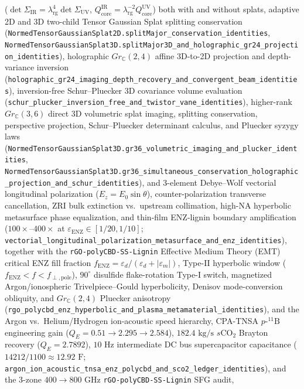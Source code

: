 ($\det\Sigma_{\mathrm{IR}}=\lambda_{\mathrm{rg}}^4\det\Sigma_{\mathrm{UV}}$,
$Q_{\mathrm{core}}^{\mathrm{IR}}=\lambda_{\mathrm{rg}}^{-2}Q_{\mathrm{core}}^{\mathrm{UV}}$)
both with and without splats, adaptive 2D and 3D two-child Tensor Gaussian Splat
splitting conservation (\texttt{NormedTensorGaussianSplat2D.splitMajor\_conservation\_identities},
\texttt{NormedTensorGaussianSplat3D.splitMajor3D\_and\_holographic\_gr24\_projection\_identities}),
holographic $Gr_{\mathbb C}(2,4)$ affine 3D-to-2D projection and depth-variance
inversion (\texttt{holographic\_gr24\_imaging\_depth\_recovery\_and\_convergent\_beam\_identities}),
inversion-free Schur--Pluecker 3D covariance volume evaluation
(\texttt{schur\_plucker\_inversion\_free\_and\_twistor\_vane\_identities}),
higher-rank $Gr_{\mathbb C}(3,6)$ direct 3D volumetric splat imaging, splitting
conservation, perspective projection, Schur--Pluecker determinant calculus, and
Pluecker syzygy laws (\texttt{NormedTensorGaussianSplat3D.gr36\_volumetric\_imaging\_and\_plucker\_identities},
\texttt{NormedTensorGaussianSplat3D.gr36\_simultaneous\_conservation\_holographic\_projection\_and\_schur\_identities}),
and 3-element Debye--Wolf vectorial longitudinal polarization ($E_z = E_0\sin\theta$),
counter-polarization transverse cancellation, ZRI bulk extinction vs.\ upstream
collimation, high-NA hyperbolic metasurface phase equalization, and thin-film
ENZ-lignin boundary amplification ($100\times$--$400\times$ at $\varepsilon_{\mathrm{ENZ}}\in[1/20,1/10]$;
\texttt{vectorial\_longitudinal\_polarization\_metasurface\_and\_enz\_identities}),
together with the \texttt{rGO-polyCBD-SS-Lignin} Effective Medium Theory (EMT)
critical ENZ fill fraction $f_{\mathrm{ENZ}}=\varepsilon_d/(\varepsilon_d+|\varepsilon_m|)$,
Type-II hyperbolic window ($f_{\mathrm{ENZ}}<f<f_{\perp,\mathrm{pole}}$), $90^\circ$
disulfide flake-rotation Type-I switch, magnetized Argon/ionospheric
Trivelpiece--Gould hyperbolicity, Denisov mode-conversion obliquity, and
$Gr_{\mathbb C}(2,4)$ Pluecker anisotropy (\texttt{rgo\_polycbd\_enz\_hyperbolic\_and\_plasma\_metamaterial\_identities}),
and the Argon vs.\ Helium/Hydrogen ion-acoustic speed hierarchy, CPA-TNSA
$p\text{-}^{11}\mathrm{B}$ engineering gain ($Q_E=0.51\to 2.295\to 2.584$),
$182.4\text{ kg/s}$ $s\mathrm{CO}_2$ Brayton recovery ($Q_E=2.7892$),
$10\text{ Hz}$ intermediate DC bus supercapacitor capacitance ($14212/1100\approx 12.92\text{ F}$;
\texttt{argon\_ion\_acoustic\_tnsa\_enz\_polycbd\_and\_sco2\_ledger\_identities}),
and the 3-zone $400\to 800\text{ GHz}$ \texttt{rGO-polyCBD-SS-Lignin} SFG audit,
